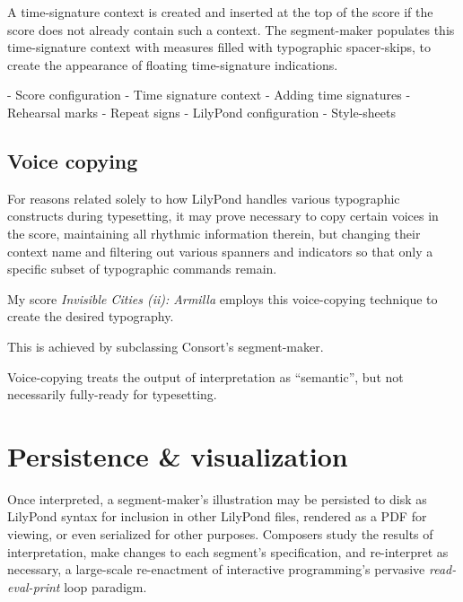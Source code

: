 A time-signature context is created and inserted at the top of the score if the
score does not already contain such a context. The segment-maker populates this
time-signature context with measures filled with typographic spacer-skips, to
create the appearance of floating time-signature indications.

\begin{markdown}
-   Score configuration
    -   Time signature context
        -   Adding time signatures
        -   Rehearsal marks
        -   Repeat signs
-   LilyPond configuration
    -   Style-sheets
\end{markdown}

\subsection{Voice copying}
\label{ssec:voice-copying}

For reasons related solely to how LilyPond handles various typographic
constructs during typesetting, it may prove necessary to copy certain voices in
the score, maintaining all rhythmic information therein, but changing their
context name and filtering out various spanners and indicators so that only a
specific subset of typographic commands remain.

My score \emph{Invisible Cities (ii): Armilla} employs this voice-copying
technique to create the desired typography.

This is achieved by subclassing Consort's segment-maker.

Voice-copying treats the output of interpretation as \enquote{semantic}, but
not necessarily fully-ready for typesetting.

\section{Persistence \& visualization}

Once interpreted, a segment-maker's illustration may be persisted to disk as
LilyPond syntax for inclusion in other LilyPond files, rendered as a PDF for
viewing, or even serialized for other purposes. Composers study the results of
interpretation, make changes to each segment's specification, and re-interpret
as necessary, a large-scale re-enactment of interactive programming's pervasive
\emph{read-eval-print} loop paradigm.